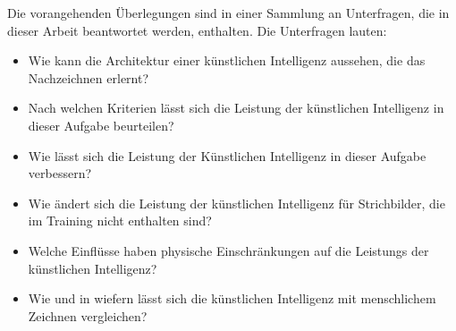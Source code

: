 Die vorangehenden Überlegungen sind in einer Sammlung an Unterfragen, die in
dieser Arbeit beantwortet werden, enthalten. Die Unterfragen lauten:
\begin{itemize}
    \item Wie kann die Architektur einer künstlichen Intelligenz aussehen, die das Nachzeichnen erlernt?
    \item Nach welchen Kriterien lässt sich die Leistung der künstlichen Intelligenz in dieser Aufgabe beurteilen?
    \item Wie lässt sich die Leistung der Künstlichen Intelligenz in dieser Aufgabe verbessern?
    \item Wie ändert sich die Leistung der künstlichen Intelligenz für Strichbilder, die im Training nicht enthalten sind?
    \item Welche Einflüsse haben physische Einschränkungen auf die Leistungs der künstlichen Intelligenz?
    \item Wie und in wiefern lässt sich die künstlichen Intelligenz mit menschlichem Zeichnen vergleichen?
\end{itemize}


